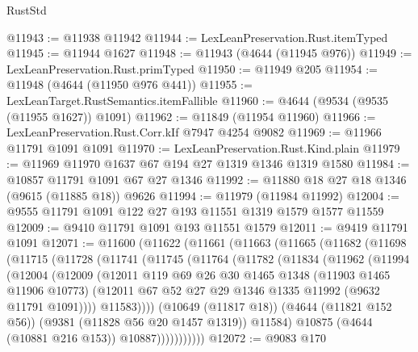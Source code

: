 \begin{lexlean}{RustStd}
\begin{coremodule}
@11943 := @11938 @11942
@11944 := LexLeanPreservation.Rust.itemTyped
@11945 := @11944 @1627
@11948 := @11943 (@4644 (@11945 @976))
@11949 := LexLeanPreservation.Rust.primTyped
@11950 := @11949 @205
@11954 := @11948 (@4644 (@11950 @976 @441))
@11955 := LexLeanTarget.RustSemantics.itemFallible
@11960 := @4644 (@9534 (@9535 (@11955 @1627)) @1091)
@11962 := @11849 (@11954 @11960)
@11966 := LexLeanPreservation.Rust.Corr.kIf @7947 @4254 @9082
@11969 := @11966 @11791 @1091 @1091
@11970 := LexLeanPreservation.Rust.Kind.plain
@11979 := @11969 @11970 @1637 @67 @194 @27 @1319 @1346 @1319 @1580
@11984 := @10857 @11791 @1091 @67 @27 @1346
@11992 := @11880 @18 @27 @18 @1346 (@9615 (@11885 @18)) @9626
@11994 := @11979 (@11984 @11992)
@12004 := @9555 @11791 @1091 @122 @27 @193 @11551 @1319 @1579 @1577 @11559
@12009 := @9410 @11791 @1091 @193 @11551 @1579
@12011 := @9419 @11791 @1091
@12071 := @11600
    (@11622
      (@11661
        (@11663
          (@11665
            (@11682
              (@11698
                (@11715
                  (@11728
                    (@11741
                      (@11745
                        (@11764
                          (@11782
                            (@11834
                              (@11962
                                (@11994
                                  (@12004
                                    (@12009
                                      (@12011
                                        @119
                                        @69
                                        @26
                                        @30
                                        @1465
                                        @1348
                                        (@11903 @1465 @11906 @10773)
                                        (@12011
                                          @67
                                          @52
                                          @27
                                          @29
                                          @1346
                                          @1335
                                          @11992
                                          (@9632 @11791 @1091))))
                                    @11583))))
                            (@10649 (@11817 @18))
                            (@4644 (@11821 @152 @56))
                            (@9381 (@11828 @56 @20 @1457 @1319))
                            @11584)
                          @10875
                          (@4644 (@10881 @216 @153))
                          @10887)))))))))))
@12072 := @9083 @170

\end{coremodule}
\end{lexlean}
